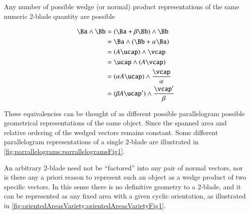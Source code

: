 Any number of possible wedge (or normal) product representations of the same numeric 2-blade quantity are possible

\begin{dmath}\label{eqn:wedgeProductArea:1940}
\begin{aligned}
\Ba \wedge \Bb
&= (\Ba + \beta \Bb ) \wedge \Bb \\
&= \Ba \wedge ( \Bb + \alpha \Ba ) \\
&= (A \ucap) \wedge \vcap \\
&= \ucap \wedge (A \vcap) \\
&= (\alpha A \ucap) \wedge \frac{\vcap}{\alpha} \\
&= (\beta A \ucap') \wedge \frac{\vcap'}{\beta} \\
\end{aligned}
\end{dmath}

These equivalencies can be thought of as different possible parallelogram possible geometrical representations of the same object. Since the spanned area and relative ordering of the wedged vectors remains constant.
Some different parallelogram representations of a single 2-blade are illustrated in \cref{fig:parrallelograms:parrallelogramsFig1}.


An arbitrary 2-blade need not be ``factored'' into any pair of normal vectors, nor is there any a priori reason to represent such an object as a wedge product of two specific vectors.
In this sense there is no definitive geometry to a 2-blade, and it can be represented as any fixed area with a given cyclic orientation, as
illustrated in \cref{fig:orientedAreasVariety:orientedAreasVarietyFig1}.



